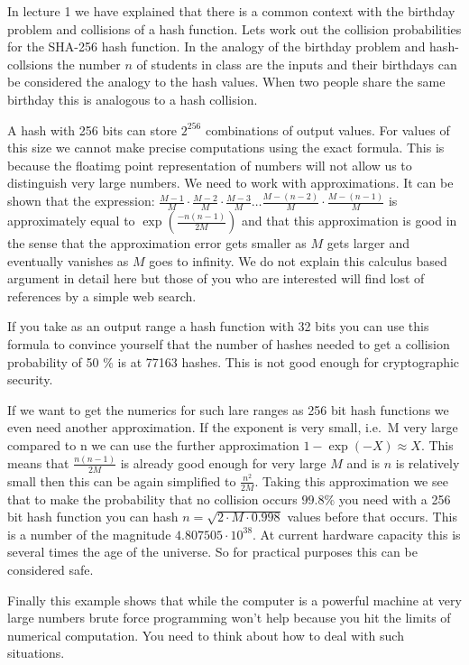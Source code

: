 \documentclass[
]{book}
\begin{document}
In lecture 1 we have explained that there is a common context with the birthday problem
and collisions of a hash function. Lets work out the collision probabilities for the
SHA-256 hash function. In the analogy of the birthday problem and hash-collsions the
number \(n\) of students in class are the inputs and their birthdays can be considered the
analogy to the hash values. When two people share the same birthday this is analogous to
a hash collision.

A hash with 256 bits can store \(2^{256}\) combinations of output values. For values
of this size we cannot make precise computations using the exact formula. This is
because the floatimg point representation of numbers will not allow us to distinguish
very large numbers. We need to work with approximations. It can be shown that the
expression:
\(\frac{M - 1}{M} \cdot \frac{M-2}{M} \cdot \frac{M-3}{M} \ldots \frac{M-(n-2)}{M} \cdot \frac{M-(n-1)}{M}\) is approximately equal to \(\exp(\frac{-n(n-1)}{2 M})\) and that this
approximation is good in the sense that the approximation error gets smaller as \(M\) gets larger
and eventually vanishes as \(M\) goes to infinity. We do not explain this calculus based argument
in detail here but those of you who are interested will find lost of references by a simple
web search.

If you take as an output range a hash function with 32 bits you can use this formula to convince
yourself that the number of hashes needed to get a collision probability of 50 \% is at
77163 hashes. This is not good enough for cryptographic security.

If we want to get the numerics for such lare ranges as 256 bit hash functions we even need
another approximation. If the exponent is very small, i.e.~M very large compared to n we can use
the further approximation \(1-\exp(-X) \approx X\). This means that \(\frac{n(n-1)}{2 M}\) is already
good enough for very large \(M\) and is \(n\) is relatively small then this can be again
simplified to \(\frac{n^2}{2 M}\). Taking this approximation we see that to make the
probability that no collision occurs \(99.8 \%\) you need with a 256 bit hash function you can
hash \(n = \sqrt{2 \cdot M \cdot 0.998}\) values before that occurs. This is a number of
the magnitude \(4.807505 \cdot 10^38\). At current hardware capacity this is several times the
age of the universe. So for practical purposes this can be considered safe.

Finally this example shows that while the computer is a powerful machine at very large numbers
brute force programming won't help because you hit the limits of numerical computation. You need
to think about how to deal with such situations.
\end{document}
